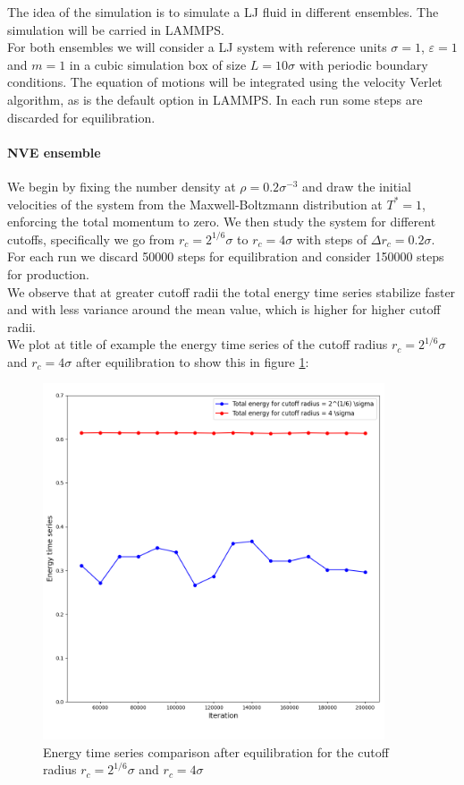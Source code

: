 The idea of the simulation is to simulate a LJ fluid in different ensembles. The simulation will be carried in LAMMPS. \\
For both ensembles we will consider a LJ system with reference units $\sigma=1$, $\varepsilon = 1$ and $m = 1$ in a cubic simulation box of size $L = 10 \sigma$ with periodic boundary conditions. 
The equation of motions will be integrated using the velocity Verlet algorithm, as is the default option in LAMMPS. In each run some steps are discarded for equilibration.

\paragraph{NVE ensemble} We begin by fixing the number density at $\rho = 0.2\sigma^{-3}$ and draw the initial velocities of the system from the Maxwell-Boltzmann distribution at $T^* = 1$, enforcing the total momentum to zero.
We then study the system for different cutoffs, specifically we go from $r_c = 2^{1/6}\sigma$ to $r_c = 4\sigma$ with steps of $\Delta r_c = 0.2\sigma$. \\
For each run we discard 50000 steps for equilibration and consider 150000 steps for production. \\
We observe that at greater cutoff radii the total energy time series stabilize faster and with less variance around the mean value, which is higher for higher cutoff radii. \\
We plot at title of example the energy time series of the cutoff radius $r_c = 2^{1/6}\sigma$ and $r_c = 4\sigma$ after equilibration to show this in figure \ref{ex10:en_comparison}:

\begin{figure}[H]
    \centering
    \includegraphics[width=0.9\textwidth]{FIG/ex10/energy_time_series.png}
    \caption{Energy time series comparison after equilibration for the cutoff radius $r_c = 2^{1/6}\sigma$ and $r_c = 4\sigma$}
    \label{ex10:en_comparison}
\end{figure}

